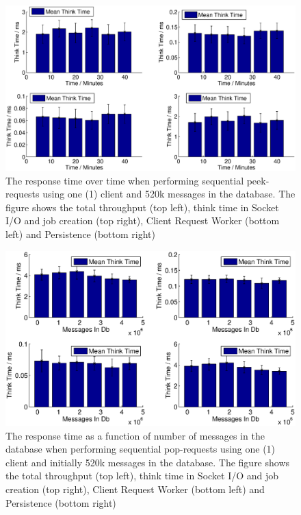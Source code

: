 \documentclass{article}
\begin{document}
            \begin{figure}[H]
                \centerline{\includegraphics[scale=0.55]{resptime_as_function_of_msgs_in_db_peek}}
                \caption{The response time over time when performing sequential peek-requests using one (1) client and 520k messages in the database. The figure shows the total throughput (top left), think time in Socket I/O and job creation (top right), Client Request Worker (bottom left) and Persistence (bottom right)}
                \label{fig:resptime_as_function_of_msgs_in_db_peek}
            \end{figure}

            \begin{figure}[H]
                \centerline{\includegraphics[scale=0.55]{resptime_as_function_of_msgs_in_db_pop}}
                \caption{The response time as a function of number of messages in the database when performing sequential pop-requests using one (1) client and initially 520k messages in the database. The figure shows the total throughput (top left), think time in Socket I/O and job creation (top right), Client Request Worker (bottom left) and Persistence (bottom right)}
                \label{fig:resptime_as_function_of_msgs_in_db_pop}
            \end{figure}
\end{document}
